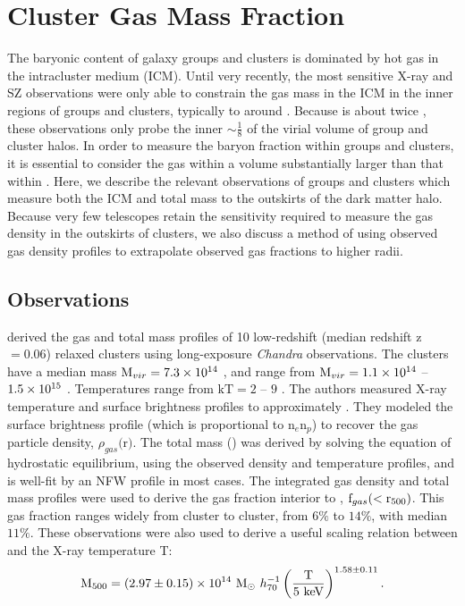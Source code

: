 \section{Cluster Gas Mass Fraction}
\label{sec:Gas}
The baryonic content of galaxy groups and clusters is dominated by hot
gas in the intracluster medium (ICM). Until very recently, the most
sensitive X-ray and SZ observations were only able to constrain the
gas mass in the ICM in the inner regions of groups and clusters,
typically to around \rfive{} .  Because \rvir{} is about twice \rfive{},
these observations only probe the inner $\sim \frac{1}{8}$ of the
virial volume of group and cluster halos. In order to measure the
baryon fraction within groups and clusters, it is essential to
consider the gas within a volume substantially larger than that within
\rfive{}. Here, we describe the relevant observations of groups and
clusters which measure both the ICM and total mass to the outskirts of
the dark matter halo. Because very few telescopes retain the
sensitivity required to measure the gas density in the outskirts of
clusters, we also discuss a method of using observed gas density
profiles to extrapolate observed gas fractions to higher radii.

\subsection{Observations}
\label{sec:Gas.Observations}
\textbf{\citet{Vikhlinin2006}} derived the gas and total mass profiles
of 10 low-redshift (median redshift z$ = 0.06$) relaxed clusters using
long-exposure \textit{Chandra} observations. The clusters have a
median mass $\textrm{M\ensuremath{_{vir}}} = 7.3 \times 10^{14}$ \Msun, and range from $\textrm{M\ensuremath{_{vir}}} =
1.1\times 10^{14}$ -- $1.5 \times 10^{15}$ \Msun. Temperatures range from $\textrm{kT}
= 2$ -- $9$ \keV. The authors measured X-ray temperature and surface
brightness profiles to approximately \rfive{}. They modeled the
surface brightness profile (which is proportional to n$_e$n$_p$) to
recover the gas particle density, $\rho_{gas}($r$)$. The total mass
(\Mfive) was derived by solving the equation of hydrostatic
equilibrium, using the observed density and temperature profiles, and
is well-fit by an NFW profile in most cases. The integrated gas
density and total mass profiles were used to derive the gas fraction
interior to \rfive{}, $\textrm{f\ensuremath{_{gas}}}(<\textrm{r\ensuremath{_{500}}})$. This gas fraction ranges widely
from cluster to cluster, from $6\%$ to $14\%$, with median
$11\%$. These observations were also used to derive a useful scaling
relation between \Mfive{} and the X-ray temperature T:
\begin{equation}
\label{eq:M-T}
\textrm{M\ensuremath{_{500}}}{} = (2.97 \pm 0.15)\times10^{14}~\textrm{M}_\odot~h_{70}^{-1}
\left(\frac{\textrm{T}}{5~\textrm{keV}}\right)^{1.58 \pm 0.11}.
\end{equation}

